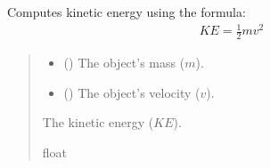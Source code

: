 \documentclass[a4paper,14pt,oneside,english,openany]{sphinxmanual}
\begin{document}
\begin{fulllineitems}
\label{\detokenize{pythagorus:pythagorus.kinetic_energy}}
\pysigstartsignatures
{}
\pysigstopsignatures
\sphinxAtStartPar
Computes kinetic energy using the formula:
\begin{equation*}
\begin{split}KE = \frac{1}{2} m v^2\end{split}
\end{equation*}\begin{quote}\begin{description}
\begin{itemize}
\item {} 
\sphinxAtStartPar
{} () \textendash{} The object’s mass (\(m\)).

\item {} 
\sphinxAtStartPar
{} () \textendash{} The object’s velocity (\(v\)).

\end{itemize}

\sphinxAtStartPar
The kinetic energy (\(KE\)).

\sphinxAtStartPar
float

\end{description}\end{quote}

\end{fulllineitems}

\end{document}
